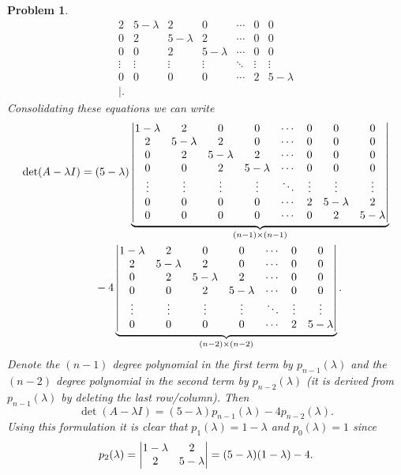 \documentclass{article}
\theoremstyle{pprop}
\newtheorem{problem}{Problem}[section]
\begin{document}
\begin{problem}
\begin{align*}
2             & 5-\lambda & 2         & 0         & \cdots  & 0       & 0         \\
0             & 2         & 5-\lambda & 2         & \cdots  & 0       & 0         \\
0             & 0         & 2         & 5-\lambda & \cdots  & 0       & 0         \\
\vdots        &  \vdots   & \vdots    & \vdots    & \ddots & \vdots  & \vdots    \\
0             & 0         & 0         & 0         & \cdots  & 2       & 5-\lambda \\
| .
\end{align*}
Consolidating these equations we can write 
\begin{align*}
  \det(A-\lambda I) & =(5-\lambda) 
 \underbrace{
  \mqty|
1-\lambda & 2 & 0 & 0 & \cdots & 0 & 0 & 0  \\
2 & 5-\lambda & 2 & 0 & \cdots & 0 & 0 & 0  \\
0 & 2 & 5-\lambda & 2 & \cdots & 0 & 0 & 0  \\
0 & 0 & 2 & 5-\lambda  & \cdots & 0 & 0 & 0  \\
\vdots &  \vdots & \vdots & \vdots & \ddots & \vdots & \vdots & \vdots  \\
0 & 0 & 0 & 0 & \cdots & 2 & 5-\lambda & 2  \\
0 & 0 & 0 & 0 & \cdots & 0 & 2 & 5-\lambda  \\
 |
 }_{(n-1)\times(n-1)} \\
 & \kern3ex - 4 
 \underbrace{\mqty|
1-\lambda     & 2         & 0         & 0         & \cdots  & 0       & 0         \\
2             & 5-\lambda & 2         & 0         & \cdots  & 0       & 0         \\
0             & 2         & 5-\lambda & 2         & \cdots  & 0       & 0         \\
0             & 0         & 2         & 5-\lambda & \cdots  & 0       & 0         \\
\vdots        &  \vdots   & \vdots    & \vdots    & \ddots & \vdots  & \vdots    \\
0             & 0         & 0         & 0         & \cdots  & 2       & 5-\lambda \\
|}_{(n-2)\times(n-2)}.
\end{align*} 
Denote the $(n-1)$ degree polynomial in the first term by $p_{n-1}(\lambda)$ and the 
$(n-2)$ degree polynomial in the second term by $p_{n-2}(\lambda)$ (it is derived from $p_{n-1}(\lambda)$ 
by deleting the last row/column). Then 
\[
\det(A-\lambda I)=(5-\lambda)p_{n-1}(\lambda)-4 p_{n-2}(\lambda).
\]   
Using this formulation it is clear that $p_1(\lambda)=1-\lambda$ and $p_0(\lambda)=1$ since 
\[
p_2(\lambda) = 
\mqty |1-\lambda & 2 \\ 2 & 5 - \lambda | = 
(5-\lambda) (1-\lambda) - 4 .
\]
\end{problem}
\end{document}
